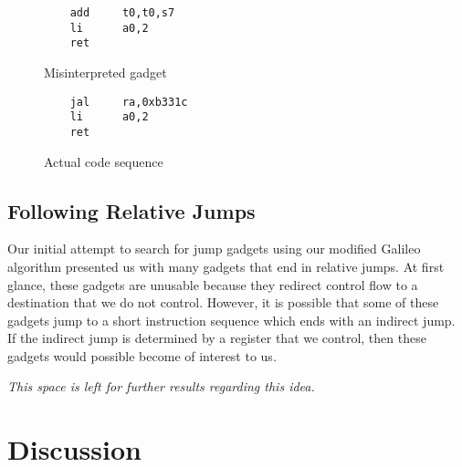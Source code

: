 \begin{figure}
    \caption{Misinterpreted gadget}
    \label{misinterpreted gadget}
    \begin{lstlisting}
    add     t0,t0,s7
    li      a0,2
    ret
    \end{lstlisting}
\end{figure}
\begin{figure}
    \caption{Actual code sequence}
    \label{actual code sequence}
    \begin{lstlisting}
    jal     ra,0xb331c
    li      a0,2
    ret
    \end{lstlisting}
\end{figure}

\subsection{Following Relative Jumps}

Our initial attempt to search for jump gadgets using our modified Galileo
algorithm presented us with many gadgets that end in relative jumps. At first
glance, these gadgets are unusable because they redirect control flow to a
destination that we do not control. However, it is possible that some of these
gadgets jump to a short instruction sequence which ends with an indirect jump.
If the indirect jump is determined by a register that we control, then these
gadgets would possible become of interest to us.

\textit{This space is left for further results regarding this idea.}


\section{Discussion}

